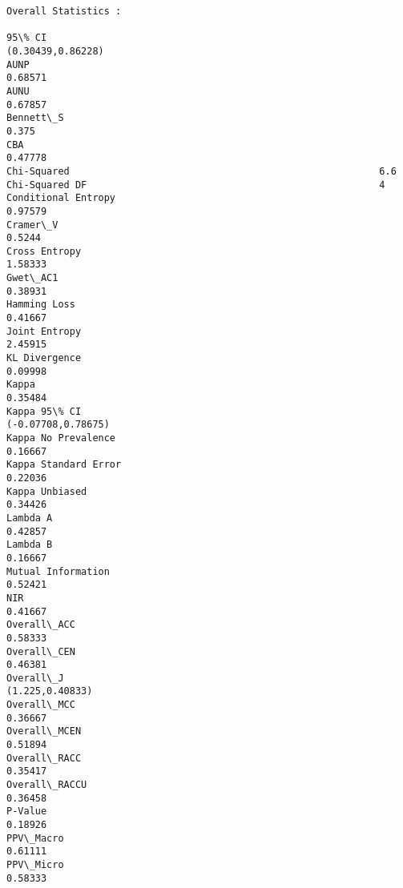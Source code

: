\documentclass[11pt]{article}
\begin{document}
    \begin{Verbatim}[commandchars=\\\{\}]
Overall Statistics : 

95\% CI                                                           (0.30439,0.86228)
AUNP                                                             0.68571
AUNU                                                             0.67857
Bennett\_S                                                        0.375
CBA                                                              0.47778
Chi-Squared                                                      6.6
Chi-Squared DF                                                   4
Conditional Entropy                                              0.97579
Cramer\_V                                                         0.5244
Cross Entropy                                                    1.58333
Gwet\_AC1                                                         0.38931
Hamming Loss                                                     0.41667
Joint Entropy                                                    2.45915
KL Divergence                                                    0.09998
Kappa                                                            0.35484
Kappa 95\% CI                                                     (-0.07708,0.78675)
Kappa No Prevalence                                              0.16667
Kappa Standard Error                                             0.22036
Kappa Unbiased                                                   0.34426
Lambda A                                                         0.42857
Lambda B                                                         0.16667
Mutual Information                                               0.52421
NIR                                                              0.41667
Overall\_ACC                                                      0.58333
Overall\_CEN                                                      0.46381
Overall\_J                                                        (1.225,0.40833)
Overall\_MCC                                                      0.36667
Overall\_MCEN                                                     0.51894
Overall\_RACC                                                     0.35417
Overall\_RACCU                                                    0.36458
P-Value                                                          0.18926
PPV\_Macro                                                        0.61111
PPV\_Micro                                                        0.58333

\end{Verbatim}
\end{document}
